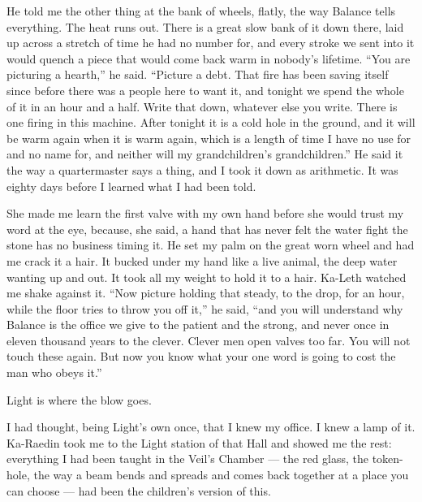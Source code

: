 He told me the other thing at the bank of wheels, flatly, the way Balance tells everything. The heat runs out. There is a great slow bank of it down there, laid up across a stretch of time he had no number for, and every stroke we sent into it would quench a piece that would come back warm in nobody's lifetime. ``You are picturing a hearth,'' he said. ``Picture a debt. That fire has been saving itself since before there was a people here to want it, and tonight we spend the whole of it in an hour and a half. Write that down, whatever else you write. There is one firing in this machine. After tonight it is a cold hole in the ground, and it will be warm again when it is warm again, which is a length of time I have no use for and no name for, and neither will my grandchildren's grandchildren.'' He said it the way a quartermaster says a thing, and I took it down as arithmetic. It was eighty days before I learned what I had been told.\par

She made me learn the first valve with my own hand before she would trust my word at the eye, because, she said, a hand that has never felt the water fight the stone has no business timing it. He set my palm on the great worn wheel and had me crack it a hair. It bucked under my hand like a live animal, the deep water wanting up and out. It took all my weight to hold it to a hair. Ka-Leth watched me shake against it. ``Now picture holding that steady, to the drop, for an hour, while the floor tries to throw you off it,'' he said, ``and you will understand why Balance is the office we give to the patient and the strong, and never once in eleven thousand years to the clever. Clever men open valves too far. You will not touch these again. But now you know what your one word is going to cost the man who obeys it.''\par

\ornament

Light is where the blow goes.\par

I had thought, being Light's own once, that I knew my office. I knew a lamp of it. Ka-Raedin took me to the Light station of that Hall and showed me the rest: everything I had been taught in the Veil's Chamber --- the red glass, the token-hole, the way a beam bends and spreads and comes back together at a place you can choose --- had been the children's version of this.\par

